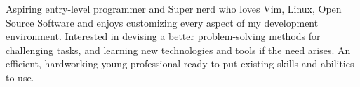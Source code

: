 

\begin{cvparagraph}

Aspiring entry-level programmer and Super nerd who loves Vim, Linux, Open Source Software and enjoys customizing every aspect of my development environment. Interested in devising a better problem-solving methods for challenging tasks, and learning new technologies and tools if the need arises. An efficient, hardworking young professional ready to put existing skills and abilities to use.

\end{cvparagraph}
